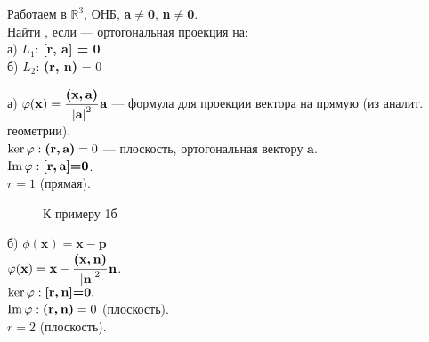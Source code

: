 \begin{prim}
	Работаем в $\mathbb{R}^3$, ОНБ, \textbf{a}$\neq$\textbf{0}, \textbf{n}$\neq$\textbf{0}.\\
	Найти \phi, если \phi --- ортогональная проекция на:\\
	а) $L_1$: \textbf{[r, a] = 0}\\
	б) $L_2$: \textbf{(r, n)} = 0
\end{prim}



\noindent а) $\phi(\textbf{x})=\cfrac{\textbf{(x,\,a)}}{\abs{\textbf{a}}^2}\,\textbf{a}$ --- формула для проекции вектора на прямую (из аналит. геометрии).\\
$\ker \phi : \textbf{(r,\,a)}=0$ --- плоскость, ортогональная вектору $\textbf{a}$.\\
$\im \phi: \textbf{[r,\,a]=0}$.\\
$r = 1$ (прямая).

\begin{wrapfigure}{r}{0.27\linewidth}
	\def\svgwidth{5cm} %
	
	\caption{К примеру 1б}
	\label{...}
	\vspace{-10cm}
\end{wrapfigure}

\noindent б) $\phi(\textbf{x})=\textbf{x}-\textbf{p}$\\
$\phi(\textbf{x})=\textbf{x}-\cfrac{\textbf{(\textbf{x},\,\textbf{n})}}{\abs{\textbf{n}}^2}\,\textbf{n}$.\\
$\ker \phi: \textbf{[r,\,n]=0}.$\\
$\im \phi: \textbf{(r,\,n)}=0$ (плоскость).\\
$r=2$ (плоскость).

